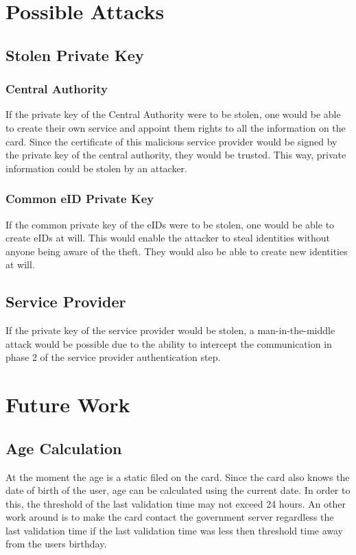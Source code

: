 \documentclass[12pt]{report}
\begin{document}
\section{Possible Attacks}
\subsection{Stolen Private Key}
\subsubsection{Central Authority}
If the private key of the Central Authority were to be stolen, one would be able to create their own service and appoint them rights to all the information on the card. Since the certificate of this malicious service provider would be signed by the private key of the central authority, they would be trusted.
This way, private information could be stolen by an attacker.
\subsubsection{Common eID Private Key}
If the common private key of the eIDs were to be stolen, one would be able to create eIDs at will. This would enable the attacker to steal identities without anyone being aware of the theft. They would also be able to create new identities at will.
\subsection{Service Provider}
If the private key of the service provider would be stolen, a man-in-the-middle attack would be possible due to the ability to intercept the communication in phase 2 of the service provider authentication step.

\section{Future Work}
\subsection{Age Calculation}
At the moment the age is a static filed on the card. Since the card also knows the date of birth of the user, age can be calculated using the current date. In order to this, the threshold of the last validation time may not exceed 24 hours. An other work around is to make the card contact the government server regardless the last validation time if the last validation time was less then threshold time away from the users birthday.
\end{document}
